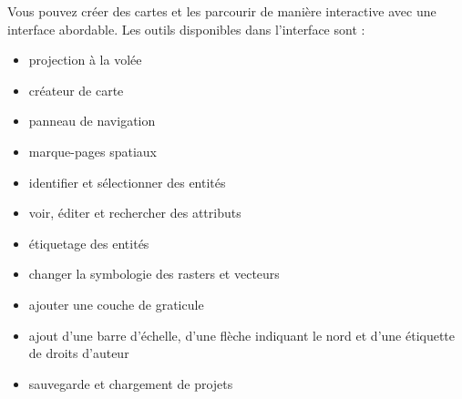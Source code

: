 
Vous pouvez créer des cartes et les parcourir de manière interactive avec une interface abordable. Les outils disponibles dans l'interface sont :


\begin{itemize}
\item projection à la volée
\item créateur de carte
\item panneau de navigation
\item marque-pages spatiaux
\item identifier et sélectionner des entités
\item voir, éditer et rechercher des attributs
\item étiquetage des entités
\item changer la symbologie des rasters et vecteurs
\item ajouter une couche de graticule
\item ajout d'une barre d'échelle, d'une flèche indiquant le nord et d'une étiquette de droits d'auteur
\item sauvegarde et chargement de projets
\end{itemize}



